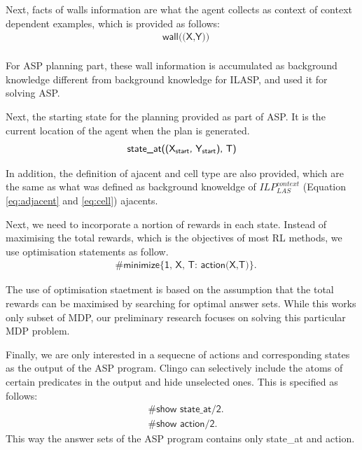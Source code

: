 Next, facts of walls information are what the agent collects as context of context dependent examples, which is provided as follows:
\begin{equation}
\begin{split}
&\textsf{wall((X,Y))}\\
\end{split}
\end{equation}
 
For ASP planning part, these wall information is accumulated as background knowledge different from background knowledge for ILASP, and used it for solving ASP. 

Next, the starting state for the planning provided as part of ASP. It is the current location of the agent when the plan is generated.
\begin{equation}
\begin{split}
\textsf{state\_at((X\textsubscript{start}, Y\textsubscript{start}), T)}
\end{split}
\end{equation}

In addition, the definition of ajacent and cell type are also provided, which are the same as what was defined as background knoweldge of $ILP_{LAS}^{context}$ (Equation \ref{eq:adjacent} and \ref{eq:cell})
ajacents.

Next, we need to incorporate a nortion of rewards in each state. Instead of maximising the total rewards, which is the objectives of most RL methods, 
we use optimisation statements as follow. 
\begin{equation}
\begin{split}
&\textsf{\#minimize\{1, X, T: action(X,T)\}}.
\end{split}
\end{equation}

The use of optimisation staetment is based on the assumption that the total rewards can be maximised by searching for optimal answer sets. 
While this works only subset of MDP, our preliminary research focuses on solving this particular MDP problem. 
    
Finally, we are only interested in a sequecne of actions and corresponding states as the output of the ASP program. 
Clingo can selectively include the atoms of certain predicates in the output and hide unselected ones. 
This is specified as follows:
\begin{equation}
\begin{split}
&\textsf{\#show state\_at/2.} \\
&\textsf{\#show action/2.}
\end{split}
\end{equation}
This way the answer sets of the ASP program contains only \textsf{state\_at} and \textsf{action}.


